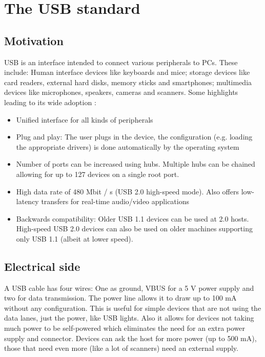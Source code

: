\documentclass{article}
\begin{document}
\section{The USB standard}
\label{sec:usb}

\subsection{Motivation}

USB is an interface intended to connect various peripherals to PCs. These include:
Human interface devices like keyboards and mice; storage devices like card readers,
external hard disks, memory sticks and smartphones; multimedia devices like microphones, speakers,
cameras and scanners. Some highlights leading to its wide adoption \cite[p. 11]{usbstd}:

\begin{itemize}
  \item Unified interface for all kinds of peripherals
  \item Plug and play: The user plugs in the device, the configuration (e.g. loading the appropriate drivers)
  is done automatically by the operating system
  \item Number of ports can be increased using hubs. Multiple hubs can be chained
        allowing for up to 127 devices on a single root port.
  \item High data rate of 480 Mbit / s (USB 2.0 high-speed mode). Also offers low-latency
        transfers for real-time audio/video applications
  \item Backwards compatibility: Older USB 1.1 devices can be used at 2.0 hosts.
        High-speed USB 2.0 devices can also be used on older
        machines supporting only USB 1.1 (albeit at lower speed).
\end{itemize}

\subsection{Electrical side}

A USB cable has four wires: One as ground, VBUS for a 5 V power supply and two for data transmission.
The power line allows it to draw up to 100 mA without any configuration. This is useful for simple
devices that are not using the data lanes, just the power, like USB lights. Also it allows for devices
not taking much power to be self-powered which eliminates the need for an extra power supply and connector.
Devices can ask the host for more power (up to 500 mA), those that need even more (like a lot of scanners) need
an external supply. \cite[p. 17f.]{usbstd}
\end{document}
